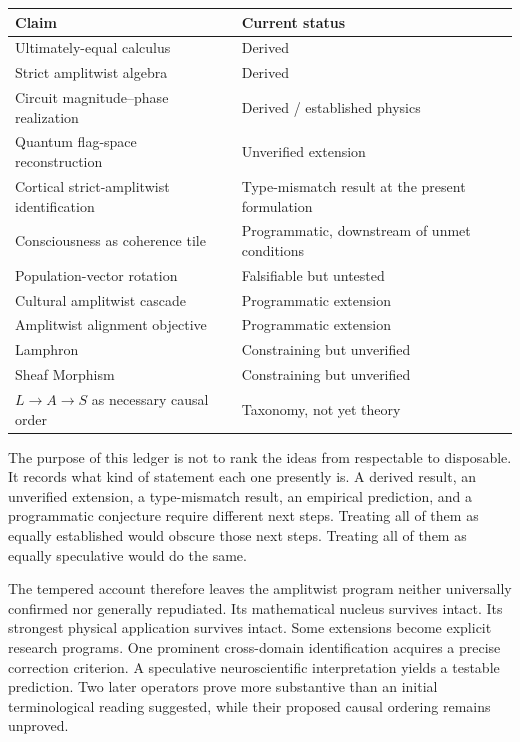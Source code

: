 \documentclass[11pt]{article}
\begin{document}
\begin{center}
\begin{tabular}{p{} p{}}
\toprule
\textbf{Claim} & \textbf{Current status}\\
\midrule
Ultimately-equal calculus & Derived\\
Strict amplitwist algebra & Derived\\
Circuit magnitude--phase realization & Derived / established physics\\
Quantum flag-space reconstruction & Unverified extension\\
Cortical strict-amplitwist identification & Type-mismatch result at the present formulation\\
Consciousness as coherence tile & Programmatic, downstream of unmet conditions\\
Population-vector rotation & Falsifiable but untested\\
Cultural amplitwist cascade & Programmatic extension\\
Amplitwist alignment objective & Programmatic extension\\
Lamphron & Constraining but unverified\\
Sheaf Morphism & Constraining but unverified\\
$L\to A\to S$ as necessary causal order & Taxonomy, not yet theory\\
\bottomrule
\end{tabular}
\end{center}

The purpose of this ledger is not to rank the ideas from respectable to disposable. It records what kind of statement each one presently is. A derived result, an unverified extension, a type-mismatch result, an empirical prediction, and a programmatic conjecture require different next steps. Treating all of them as equally established would obscure those next steps. Treating all of them as equally speculative would do the same.

The tempered account therefore leaves the amplitwist program neither universally confirmed nor generally repudiated. Its mathematical nucleus survives intact. Its strongest physical application survives intact. Some extensions become explicit research programs. One prominent cross-domain identification acquires a precise correction criterion. A speculative neuroscientific interpretation yields a testable prediction. Two later operators prove more substantive than an initial terminological reading suggested, while their proposed causal ordering remains unproved.
\end{document}
